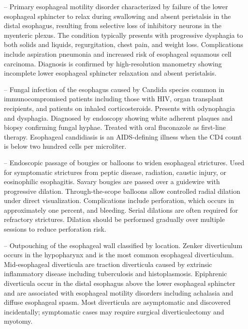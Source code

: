 -- Primary esophageal motility disorder characterized by failure of the lower esophageal sphincter to relax during swallowing and absent peristalsis in the distal esophagus, resulting from selective loss of inhibitory neurons in the myenteric plexus. The condition typically presents with progressive dysphagia to both solids and liquids, regurgitation, chest pain, and weight loss. Complications include aspiration pneumonia and increased risk of esophageal squamous cell carcinoma. Diagnosis is confirmed by high-resolution manometry showing incomplete lower esophageal sphincter relaxation and absent peristalsis.

-- Fungal infection of the esophagus caused by Candida species common in immunocompromised patients including those with HIV, organ transplant recipients, and patients on inhaled corticosteroids. Presents with odynophagia and dysphagia. Diagnosed by endoscopy showing white adherent plaques and biopsy confirming fungal hyphae. Treated with oral fluconazole as first-line therapy. Esophageal candidiasis is an AIDS-defining illness when the CD4 count is below two hundred cells per microliter.

-- Endoscopic passage of bougies or balloons to widen esophageal strictures. Used for symptomatic strictures from peptic disease, radiation, caustic injury, or eosinophilic esophagitis. Savary bougies are passed over a guidewire with progressive dilation. Through-the-scope balloons allow controlled radial dilation under direct visualization. Complications include perforation, which occurs in approximately one percent, and bleeding. Serial dilations are often required for refractory strictures. Dilation should be performed gradually over multiple sessions to reduce perforation risk.

-- Outpouching of the esophageal wall classified by location. Zenker diverticulum occurs in the hypopharynx and is the most common esophageal diverticulum. Mid-esophageal diverticula are traction diverticula caused by extrinsic inflammatory disease including tuberculosis and histoplasmosis. Epiphrenic diverticula occur in the distal esophagus above the lower esophageal sphincter and are associated with esophageal motility disorders including achalasia and diffuse esophageal spasm. Most diverticula are asymptomatic and discovered incidentally; symptomatic cases may require surgical diverticulectomy and myotomy.

